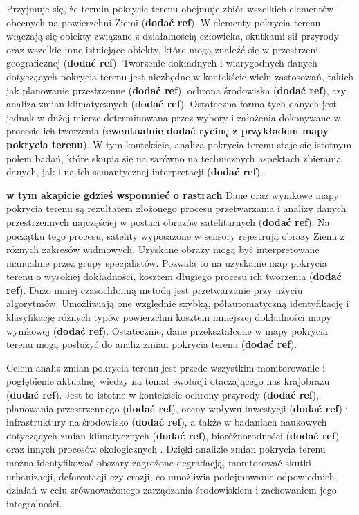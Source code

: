 \documentclass{amuthesis}
\begin{document}
Przyjmuje się, że termin pokrycie terenu obejmuje zbiór wszelkich
elementów obecnych na powierzchni Ziemi (\textbf{dodać ref}). W elementy
pokrycia terenu włączają się obiekty związane z działalnością człowieka,
skutkami sił przyrody oraz wszelkie inne istniejące obiekty, które mogą
znaleźć się w przestrzeni geograficznej (\textbf{dodać ref}). Tworzenie
dokładnych i wiarygodnych danych dotyczących pokrycia terenu jest
niezbędne w kontekście wielu zastosowań, takich jak planowanie
przestrzenne (\textbf{dodać ref}), ochrona środowiska (\textbf{dodać
ref}), czy analiza zmian klimatycznych (\textbf{dodać ref}). Ostateczna
forma tych danych jest jednak w dużej mierze determinowana przez wybory
i założenia dokonywane w procesie ich tworzenia (\textbf{ewentualnie
dodać rycinę z przykładem mapy pokrycia terenu}). W tym kontekście,
analiza pokrycia terenu staje się istotnym polem badań, które skupia się
na zarówno na technicznych aspektach zbierania danych, jak i na ich
semantycznej interpretacji (\textbf{dodać ref}).

\textbf{w tym akapicie gdzieś wspomnieć o rastrach} Dane oraz wynikowe
mapy pokrycia terenu są rezultatem złożonego procesu przetwarzania i
analizy danych przestrzennych najczęściej w postaci obrazów
satelitarnych (\textbf{dodać ref}). Na początku tego procesu, satelity
wyposażone w sensory rejestrują obrazy Ziemi z różnych zakresów
widmowych. Uzyskane obrazy mogą być interpretowane manualnie przez grupy
specjalistów. Pozwala to na uzyskanie map pokrycia terenu o wysokiej
dokładności, kosztem długiego procesu ich tworzenia (\textbf{dodać
ref}). Dużo mniej czasochłonną metodą jest przetwarzanie przy użyciu
algorytmów. Umożliwiają one względnie szybką, półautomatyczną
identyfikację i klasyfikację różnych typów powierzchni kosztem mniejszej
dokładności mapy wynikowej (\textbf{dodać ref}). Ostatecznie, dane
przekształcone w mapy pokrycia terenu mogą posłużyć do analiz zmian
pokrycia terenu (\textbf{dodać ref}).

Celem analiz zmian pokrycia terenu jest przede wszystkim monitorowanie i
pogłębienie aktualnej wiedzy na temat ewolucji otaczającego nas
krajobrazu (\textbf{dodać ref}). Jest to istotne w kontekście ochrony
przyrody (\textbf{dodać ref}), planowania przestrzennego (\textbf{dodać
ref}), oceny wpływu inwestycji (\textbf{dodać ref}) i infrastruktury na
środowisko (\textbf{dodać ref}), a także w badaniach naukowych
dotyczących zmian klimatycznych (\textbf{dodać ref}), bioróżnorodności
(\textbf{dodać ref}) oraz innych procesów ekologicznych
\autocite{ChangeDetectionTechniques}. Dzięki analizie zmian pokrycia
terenu można identyfikować obszary zagrożone degradacją, monitorować
skutki urbanizacji, deforestacji czy erozji, co umożliwia podejmowanie
odpowiednich działań w celu zrównoważonego zarządzania środowiskiem i
zachowaniem jego integralności.
\end{document}
